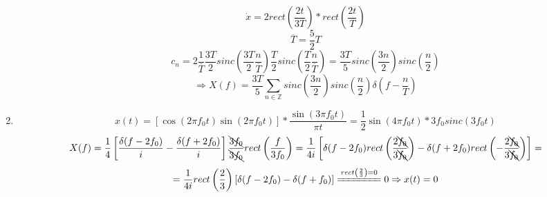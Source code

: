 \documentclass{article}
\begin{document}
\begin{enumerate}
        \[\dot{x}=2rect\left(\frac{2t}{3T}\right)*rect\left(\frac{2t}{T}\right)\]
        \[\overline{T}=\frac{5}{2}T\]
        \[c_n=2\frac{1}{\overline{T}}\frac{3T}{2}sinc\left(\frac{3T}{2}\frac{n}{\overline{T}}\right)\frac{T}{2}sinc\left(\frac{T}{2}\frac{n}{\overline{T}}\right)=\frac{3T}{5}sinc\left(\frac{3n}{2}\right)sinc\left(\frac{n}{2}\right)\]
        \[\Rightarrow X(f)=\frac{3T}{5}\sum_{n\in\mathbb{Z}}sinc\left(\frac{3n}{2}\right)sinc\left(\frac{n}{2}\right)\delta\left(f-\frac{n}{T}\right)\]
    \item \[x(t)=[\cos(2\pi f_0 t)\sin(2\pi f_0 t)]*\frac{\sin(3\pi f_0 t)}{\pi t}=\frac{1}{2}\sin(4\pi f_0 t)*3f_0 sinc(3f_0 t)\]
        \[X(f)=\frac{1}{4}\left[\frac{\delta(f-2f_0)}{i}-\frac{\delta(f+2f_0)}{i}\right]\frac{\bcancel{3f_0}}{\bcancel{3f_0}}rect\left(\frac{f}{3f_0}\right)=\frac{1}{4i}\left[\delta(f-2f_0)rect\left(\frac{2\bcancel{f_0}}{3\bcancel{f_0}}\right)-\delta(f+2f_0)rect\left(-\frac{2\bcancel{f_0}}{3\bcancel{f_0}}\right)\right]=\]
        \[=\frac{1}{4i}rect\left(\frac{2}{3}\right)\left[\delta(f-2f_0)-\delta(f+f_0)\right]\xlongequal{rect\left(\frac{2}{3}\right)=0}0\Rightarrow x(t)=0\]
\end{enumerate}
\end{document}
